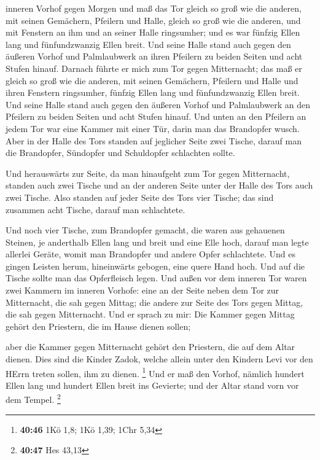 inneren Vorhof gegen Morgen und maß das Tor gleich so groß wie die
anderen,  mit seinen Gemächern, Pfeilern und Halle, gleich
so groß wie die anderen, und mit Fenstern an ihm und an seiner Halle
ringsumher; und es war fünfzig Ellen lang und fünfundzwanzig Ellen
breit.  Und seine Halle stand auch gegen den äußeren Vorhof
und Palmlaubwerk an ihren Pfeilern zu beiden Seiten und acht Stufen
hinauf.  Darnach führte er mich zum Tor gegen Mitternacht;
das maß er gleich so groß wie die anderen,  mit seinen
Gemächern, Pfeilern und Halle und ihren Fenstern ringsumher, fünfzig
Ellen lang und fünfundzwanzig Ellen breit.  Und seine Halle
stand auch gegen den äußeren Vorhof und Palmlaubwerk an den Pfeilern zu
beiden Seiten und acht Stufen hinauf.  Und unten an den
Pfeilern an jedem Tor war eine Kammer mit einer Tür, darin man das
Brandopfer wusch.  Aber in der Halle des Tors standen auf
jeglicher Seite zwei Tische, darauf man die Brandopfer, Sündopfer und
Schuldopfer schlachten sollte.

 Und herauswärts zur Seite, da man hinaufgeht zum Tor gegen
Mitternacht, standen auch zwei Tische und an der anderen Seite unter der
Halle des Tors auch zwei Tische.  Also standen auf jeder
Seite des Tors vier Tische; das sind zusammen acht Tische, darauf man
schlachtete.

 Und noch vier Tische, zum Brandopfer gemacht, die waren
aus gehauenen Steinen, je anderthalb Ellen lang und breit und eine Elle
hoch, darauf man legte allerlei Geräte, womit man Brandopfer und andere
Opfer schlachtete.  Und es gingen Leisten herum,
hineinwärts gebogen, eine quere Hand hoch. Und auf die Tische sollte man
das Opferfleisch legen.  Und außen vor dem inneren Tor
waren zwei Kammern im inneren Vorhofe: eine an der Seite neben dem Tor
zur Mitternacht, die sah gegen Mittag; die andere zur Seite des Tors
gegen Mittag, die sah gegen Mitternacht.  Und er sprach zu
mir: Die Kammer gegen Mittag gehört den Priestern, die im Hause dienen
sollen;

 aber die Kammer gegen Mitternacht gehört den Priestern,
die auf dem Altar dienen. Dies sind die Kinder Zadok, welche allein
unter den Kindern Levi vor den HErrn treten sollen, ihm zu dienen.
\footnote{\textbf{40:46} 1Kö 1,8; 1Kö 1,39; 1Chr 5,34}  Und
er maß den Vorhof, nämlich hundert Ellen lang und hundert Ellen breit
ins Gevierte; und der Altar stand vorn vor dem Tempel. \footnote{\textbf{40:47}
  Hes 43,13}

